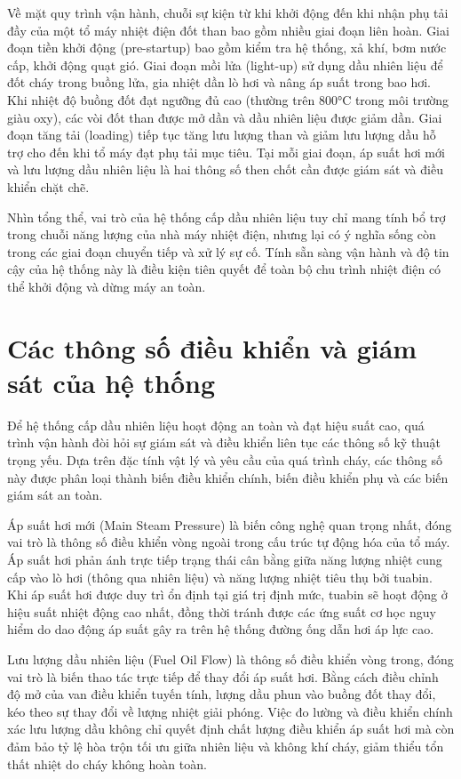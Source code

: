 \documentclass[../main.tex]{subfiles}
\begin{document}
Về mặt quy trình vận hành, chuỗi sự kiện từ khi khởi động đến khi nhận phụ tải đầy của một tổ máy nhiệt điện đốt than bao gồm nhiều giai đoạn liên hoàn. Giai đoạn tiền khởi động (pre-startup) bao gồm kiểm tra hệ thống, xả khí, bơm nước cấp, khởi động quạt gió. Giai đoạn mồi lửa (light-up) sử dụng dầu nhiên liệu để đốt cháy trong buồng lửa, gia nhiệt dần lò hơi và nâng áp suất trong bao hơi. Khi nhiệt độ buồng đốt đạt ngưỡng đủ cao (thường trên 800°C trong môi trường giàu oxy), các vòi đốt than được mở dần và dầu nhiên liệu được giảm dần. Giai đoạn tăng tải (loading) tiếp tục tăng lưu lượng than và giảm lưu lượng dầu hỗ trợ cho đến khi tổ máy đạt phụ tải mục tiêu. Tại mỗi giai đoạn, áp suất hơi mới và lưu lượng dầu nhiên liệu là hai thông số then chốt cần được giám sát và điều khiển chặt chẽ.

Nhìn tổng thể, vai trò của hệ thống cấp dầu nhiên liệu tuy chỉ mang tính bổ trợ trong chuỗi năng lượng của nhà máy nhiệt điện, nhưng lại có ý nghĩa sống còn trong các giai đoạn chuyển tiếp và xử lý sự cố. Tính sẵn sàng vận hành và độ tin cậy của hệ thống này là điều kiện tiên quyết để toàn bộ chu trình nhiệt điện có thể khởi động và dừng máy an toàn.

\section{Các thông số điều khiển và giám sát của hệ thống}

Để hệ thống cấp dầu nhiên liệu hoạt động an toàn và đạt hiệu suất cao, quá trình vận hành đòi hỏi sự giám sát và điều khiển liên tục các thông số kỹ thuật trọng yếu. Dựa trên đặc tính vật lý và yêu cầu của quá trình cháy, các thông số này được phân loại thành biến điều khiển chính, biến điều khiển phụ và các biến giám sát an toàn.

Áp suất hơi mới (Main Steam Pressure) là biến công nghệ quan trọng nhất, đóng vai trò là thông số điều khiển vòng ngoài trong cấu trúc tự động hóa của tổ máy. Áp suất hơi phản ánh trực tiếp trạng thái cân bằng giữa năng lượng nhiệt cung cấp vào lò hơi (thông qua nhiên liệu) và năng lượng nhiệt tiêu thụ bởi tuabin. Khi áp suất hơi được duy trì ổn định tại giá trị định mức, tuabin sẽ hoạt động ở hiệu suất nhiệt động cao nhất, đồng thời tránh được các ứng suất cơ học nguy hiểm do dao động áp suất gây ra trên hệ thống đường ống dẫn hơi áp lực cao.

Lưu lượng dầu nhiên liệu (Fuel Oil Flow) là thông số điều khiển vòng trong, đóng vai trò là biến thao tác trực tiếp để thay đổi áp suất hơi. Bằng cách điều chỉnh độ mở của van điều khiển tuyến tính, lượng dầu phun vào buồng đốt thay đổi, kéo theo sự thay đổi về lượng nhiệt giải phóng. Việc đo lường và điều khiển chính xác lưu lượng dầu không chỉ quyết định chất lượng điều khiển áp suất hơi mà còn đảm bảo tỷ lệ hòa trộn tối ưu giữa nhiên liệu và không khí cháy, giảm thiểu tổn thất nhiệt do cháy không hoàn toàn.
\end{document}
